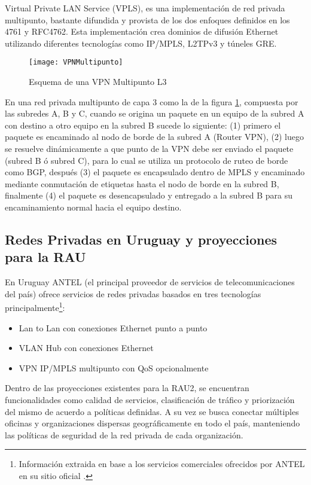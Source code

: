 Virtual Private LAN Service (VPLS), es una implementaci\'on de red privada multipunto, bastante difundida y provista de los dos enfoques definidos en los 4761\citep{kompella2007virtual} y RFC4762\cite{lasserre2007virtual}. Esta implementaci\'on crea dominios de difusión Ethernet utilizando diferentes tecnologías como IP/MPLS, L2TPv3 y túneles GRE.

\begin{figure}[htbp!] 
\centering    
\texttt{[image: VPNMultipunto]}
\caption[Esquema de una VPN Multipunto ]{Esquema de una VPN Multipunto L3}
\label{fig:VPNMulipunto}
\end{figure}
 
En una red privada multipunto de capa 3 como la de la figura \ref{fig:VPNMulipunto}, compuesta por las subredes A, B y C, cuando se origina un paquete en un equipo de la subred A con destino a otro equipo en la subred B sucede lo siguiente: (1) primero el paquete es encaminado al nodo de borde de la subred A (Router VPN), (2) luego se resuelve din\'amicamente a que punto de la VPN debe ser enviado el paquete (subred B \'o subred C), para lo cual se utiliza un protocolo de ruteo de borde como BGP, después (3) el paquete es encapsulado dentro de MPLS y encaminado mediante conmutaci\'on de etiquetas hasta el nodo de borde en la subred B, finalmente (4) el paquete es desencapsulado y entregado a la subred B para su encaminamiento normal hacia el equipo destino.

\subsection{Redes Privadas en Uruguay y proyecciones para la RAU}
En Uruguay ANTEL (el principal proveedor de servicios de telecomunicaciones del país) ofrece servicios de redes privadas basados en tres tecnolog\'ias principalmente\footnote{Informaci\'on extraida en base a los servicios comerciales ofrecidos por ANTEL en su sitio oficial \cite{ANTELVPN}.}: 

\begin{itemize}
\item Lan to Lan con conexiones Ethernet punto a punto
\item VLAN Hub con conexiones Ethernet 
\item VPN IP/MPLS multipunto con QoS opcionalmente
\end{itemize} 

Dentro de las proyecciones existentes para la RAU2, se encuentran funcionalidades como calidad de servicios, clasificaci\'on de tr\'afico y priorizaci\'on del mismo de acuerdo a pol\'iticas definidas. A su vez se busca conectar m\'ultiples oficinas y organizaciones dispersas geográficamente en todo el país, manteniendo las pol\'iticas de seguridad de la red privada de cada organizaci\'on. 

